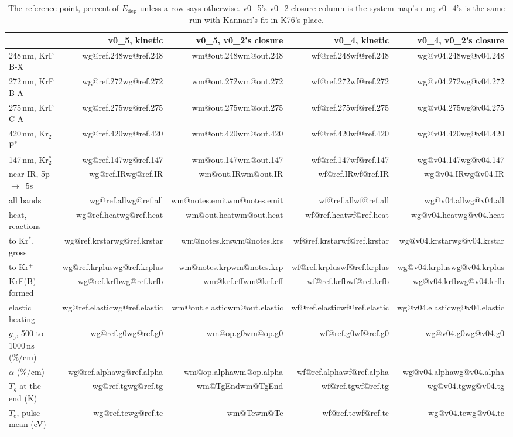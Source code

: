 \documentclass[11pt]{article}
\makeatletter
\newcommand\wf[1]{\ifcsname wf@#1\endcsname\csname wf@#1\endcsname
  \else\errmessage{no v0_4 number '#1'. Rerun make_overview_v0_4.py}\fi}
\newcommand\wm[1]{\ifcsname wm@#1\endcsname\csname wm@#1\endcsname
  \else\errmessage{no map number '#1'. Rerun make_system_map_v0_5.py}\fi}
\newcommand\wg[1]{\ifcsname wg@#1\endcsname\csname wg@#1\endcsname
  \else\errmessage{no v0_5 number '#1'. Rerun make_overview_v0_5.py}\fi}
\newcommand{\unit}[1]{\ensuremath{\,\mathrm{#1}}}
\newcommand{\Krs}{Kr\ensuremath{^*}}
\newcommand{\Krp}{Kr\ensuremath{^+}}
\newcommand{\Krts}{Kr\ensuremath{_2^*}}
\newcommand{\KtF}{Kr\ensuremath{_2}F\ensuremath{^*}}
\newcommand{\ra}{\ensuremath{\to}\ }
\newcommand{\Edep}{\ensuremath{E_\mathrm{dep}}}
\makeatother
\begin{document}
\begin{table}[H]
\centering\footnotesize
\begin{tabular}{@{}lrrrr@{}}
\toprule
 & v0\_5, kinetic & v0\_5, v0\_2's closure & v0\_4, kinetic & v0\_4, v0\_2's closure\\
\midrule
248\unit{nm}, KrF B-X & \wg{ref.248} & \wm{out.248} & \wf{ref.248} & \wg{v04.248}\\
272\unit{nm}, KrF B-A & \wg{ref.272} & \wm{out.272} & \wf{ref.272} & \wg{v04.272}\\
275\unit{nm}, KrF C-A & \wg{ref.275} & \wm{out.275} & \wf{ref.275} & \wg{v04.275}\\
420\unit{nm}, \KtF{} & \wg{ref.420} & \wm{out.420} & \wf{ref.420} & \wg{v04.420}\\
147\unit{nm}, \Krts{} & \wg{ref.147} & \wm{out.147} & \wf{ref.147} & \wg{v04.147}\\
near IR, 5p \ra 5s & \wg{ref.IR} & \wm{out.IR} & \wf{ref.IR} & \wg{v04.IR}\\
all bands & \wg{ref.all} & \wm{notes.emit} & \wf{ref.all} & \wg{v04.all}\\
heat, reactions & \wg{ref.heat} & \wm{out.heat} & \wf{ref.heat} & \wg{v04.heat}\\
to \Krs{}, gross & \wg{ref.krstar} & \wm{notes.krs} & \wf{ref.krstar} & \wg{v04.krstar}\\
to \Krp{} & \wg{ref.krplus} & \wm{notes.krp} & \wf{ref.krplus} & \wg{v04.krplus}\\
KrF(B) formed & \wg{ref.krfb} & \wm{krf.eff} & \wf{ref.krfb} & \wg{v04.krfb}\\
elastic heating & \wg{ref.elastic} & \wm{out.elastic} & \wf{ref.elastic} & \wg{v04.elastic}\\
$g_0$, 500 to 1000\unit{ns} (\%/cm) & \wg{ref.g0} & \wm{op.g0} & \wf{ref.g0} & \wg{v04.g0}\\
$\alpha$ (\%/cm) & \wg{ref.alpha} & \wm{op.alpha} & \wf{ref.alpha} & \wg{v04.alpha}\\
$T_g$ at the end (K) & \wg{ref.tg} & \wm{TgEnd} & \wf{ref.tg} & \wg{v04.tg}\\
$T_e$, pulse mean (eV) & \wg{ref.te} & \wm{Te} & \wf{ref.te} & \wg{v04.te}\\
\bottomrule
\end{tabular}
\caption{The reference point, percent of \Edep{} unless a row says
otherwise. v0\_5's v0\_2-closure column is the system map's run; v0\_4's
is the same run with Kannari's fit in K76's place.}
\label{tab:ref}
\end{table}
\end{document}
